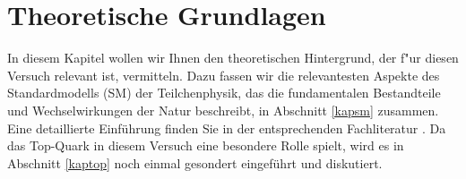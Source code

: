 \section{Theoretische Grundlagen}
\label{sm_chapter}
In diesem Kapitel wollen wir Ihnen den theoretischen Hintergrund, der f"ur diesen Versuch relevant ist, vermitteln. Dazu fassen wir die relevantesten Aspekte des Standardmodells (SM) der Teilchenphysik, das die fundamentalen Bestandteile und Wechselwirkungen der Natur beschreibt, in Abschnitt \ref{kapsm} zusammen. Eine detaillierte Einf\"uhrung finden Sie in der entsprechenden Fachliteratur \cite{Griffiths, Berger}. Da das Top-Quark in diesem Versuch eine besondere Rolle spielt, wird es in Abschnitt \ref{kaptop} noch einmal gesondert eingef\"uhrt und diskutiert.


